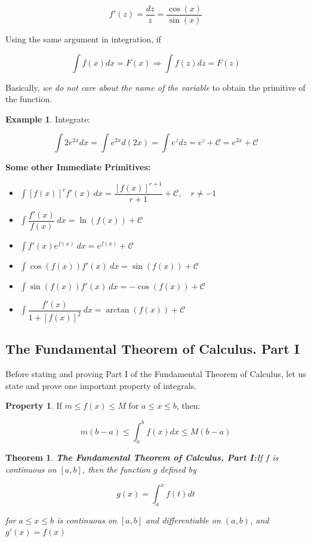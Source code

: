 \documentclass[a4paper,11pt]{article}
\theoremstyle{definition}
\newtheorem{property}{Property}
\newtheorem{example}{Example}
\theoremstyle{plain}
\newtheorem{theorem}{Theorem}
\begin{document}
\[
f'(z) = \frac{dz}{z} = \frac{\cos(x)}{\sin(x)}
\]

Using the same argument in integration, if

\[
\int f(x) dx = F(x) \Rightarrow \int f(z) dz = F(z)
\]

Basically, \emph{we do not care about the name of the variable} to obtain the primitive of the function.

\begin{example}
Integrate: 

$$
\int 2 e^{2x} dx = \int e^{2x}d(2x) = \int e^z dz = e^z + \mathcal{C} = e^{2x} + \mathcal{C}
$$
\end{example}

\textbf{Some other Immediate Primitives:}
\begin{itemize}
	\item $\displaystyle\int [f(x)]^r f'(x) \: dx = \dfrac{[f(x)]^{r+1}}{r+1} + \mathcal{C}, \quad r \neq -1$
	\item $\displaystyle\int \dfrac{f'(x)}{f(x)} \: dx = \ln(f(x)) + \mathcal{C}$
	\item $\displaystyle\int f'(x) e^{f(x)} \: dx = e^{f(x)} + \mathcal{C}$
	\item $\displaystyle\int \cos(f(x))f'(x) \: dx = \sin(f(x)) + \mathcal{C}$
	\item $\displaystyle\int \sin(f(x)) f'(x) \: dx = -\cos(f(x)) + \mathcal{C}$
	\item $\displaystyle\int \dfrac{f'(x)}{1+[f(x)]^2} \: dx = \arctan(f(x)) + \mathcal{C}$
\end{itemize}

\subsection{The Fundamental Theorem of Calculus. Part I}\label{the-fundamental-theorem-of-calculus.-part-i}

Before stating and proving Part I of the Fundamental Theorem of Calculus, let us state and prove one important property of integrals.

\begin{property}\label{bounds}
If \(m\leq f(x) \leq M\) for \(a\leq x \leq b\), then:

\[
m(b-a) \leq \int^b_a f(x) dx \leq M(b-a) 
\]
\end{property}

\begin{theorem}{\textbf{The Fundamental Theorem of Calculus, Part I:}}\label{thm:FTC1}
If \(f\) is continuous on \([a,b]\), then the function \(g\) defined by

\[
g(x) = \int^x_a f(t) dt
\]

for \(a\leq x \leq b\) is continuous on \([a,b]\) and differentiable on \((a,b)\), and \(g'(x) = f(x)\)
\end{theorem}
\end{document}
